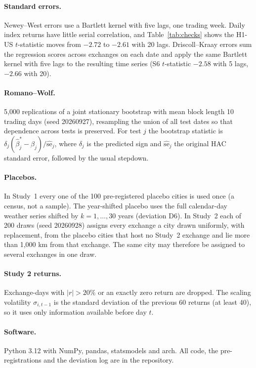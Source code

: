 \documentclass[11pt]{article}
\begin{document}
\paragraph{Standard errors.} Newey--West errors use a Bartlett kernel with five lags, one trading
week. Daily index returns have little serial correlation, and Table~\ref{tab:checks} shows the H1-US
$t$-statistic moves from $-2.72$ to $-2.61$ with 20 lags. Driscoll--Kraay errors sum the regression
scores across exchanges on each date and apply the same Bartlett kernel with five lags to the
resulting time series (S6 $t$-statistic $-2.58$ with 5 lags, $-2.66$ with 20).

\paragraph{Romano--Wolf.} 5,000 replications of a joint stationary bootstrap with mean block length
10 trading days (seed 20260927), resampling the union of all test dates so that dependence across
tests is preserved. For test $j$ the bootstrap statistic is
$\delta_j(\hat\beta^{*}_j-\hat\beta_j)/\widehat{\mathrm{se}}_j$, where $\delta_j$ is the predicted
sign and $\widehat{\mathrm{se}}_j$ the original HAC standard error, followed by the usual stepdown.

\paragraph{Placebos.} In Study~1 every one of the 100 pre-registered placebo cities is used once (a
census, not a sample). The year-shifted placebo uses the full calendar-day weather series shifted
by $k=1,\dots,30$ years (deviation D6). In Study~2 each of 200 draws (seed 20260928) assigns every
exchange a city drawn uniformly, with replacement, from the placebo cities that host no Study~2
exchange and lie more than 1,000 km from that exchange. The same city may therefore be assigned to
several exchanges in one draw.

\paragraph{Study 2 returns.} Exchange-days with $|r|>20\%$ or an exactly zero return are dropped.
The scaling volatility $\sigma_{i,t-1}$ is the standard deviation of the previous 60 returns (at
least 40), so it uses only information available before day $t$.

\paragraph{Software.} Python 3.12 with NumPy, pandas, statsmodels and arch. All code, the
pre-registrations and the deviation log are in the repository.
\end{document}
